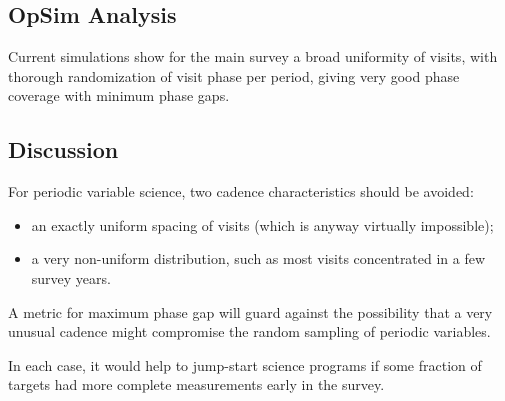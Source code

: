 
\subsection{OpSim Analysis}
\label{sec:keyword:analysis}

Current simulations show for the main survey a broad uniformity of visits, with thorough randomization of visit phase per period, giving very good phase coverage with minimum phase gaps.



\subsection{Discussion}
\label{sec:keyword:discussion}

For periodic variable science, two cadence characteristics should be avoided:
\begin{itemize}
\item an exactly uniform spacing of visits (which is anyway virtually impossible); \
\item a very non-uniform distribution, such as most visits concentrated in a few survey years.
 \end{itemize}

A metric for maximum phase gap will guard against the possibility that a very unusual cadence might compromise the random sampling of periodic variables.

In each case, it would help to jump-start science programs if some fraction of targets had more complete measurements early in the survey.



\navigationbar
